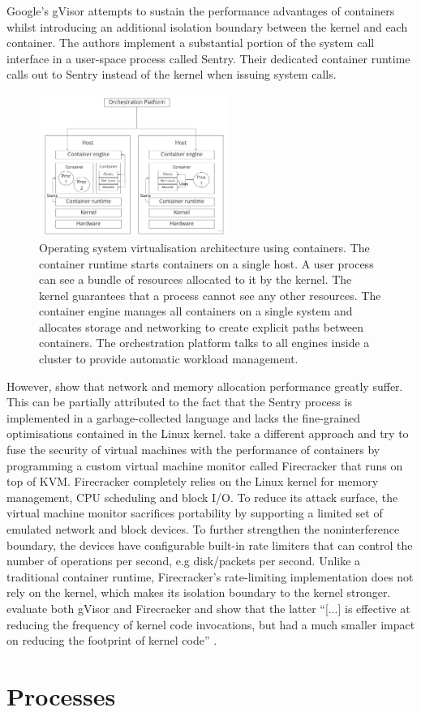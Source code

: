 Google's gVisor \cite{google-gvisor} attempts to sustain the performance advantages of 
containers whilst introducing an additional isolation boundary between the kernel and each container. The authors implement 
a substantial portion of the system call interface in a user-space process called Sentry.
Their dedicated container runtime calls out to Sentry instead of the kernel when issuing system calls.
\begin{figure}[H]
    \centering
    \includegraphics[width=0.55\textwidth]{images/fundamentals/cont-arch.jpg}
    \caption{Operating system virtualisation architecture using containers. The container runtime starts containers on a single host.
    A user process can see a bundle of resources allocated to it by the kernel. The kernel guarantees that a process 
    cannot see any other resources.
    The container engine manages all containers on a single system and allocates storage and networking to create explicit paths between containers.
    The orchestration platform talks to all engines inside a cluster to provide automatic workload management.}
    \label{images:fundamentals/cont-arch.jpg}
\end{figure}
However, \textcite{234857} show that network and memory allocation performance greatly suffer. 
This can be partially attributed to the fact that the Sentry process is implemented in a garbage-collected language 
and lacks the fine-grained optimisations contained in the Linux kernel.
\textcite{246288} take a different approach and try to fuse the security of virtual machines 
with the performance of containers by programming a custom virtual machine monitor 
called Firecracker that runs on top of KVM. Firecracker completely relies on the
Linux kernel for memory management, CPU scheduling and block I/O. To reduce its attack surface,
the virtual machine monitor sacrifices portability by supporting a limited set of emulated 
network and block devices. To further strengthen the noninterference boundary, the devices 
have configurable built-in rate limiters that can control the number of operations per second, e.g
disk/packets per second. Unlike a traditional container runtime, Firecracker's rate-limiting implementation
does not rely on the kernel, which makes its isolation boundary to the kernel stronger. 
\textcite{10.1145/3381052.3381315} evaluate both gVisor and Firecracker and show that 
the latter \enquote{[...] is effective at reducing the frequency of kernel code invocations, but had 
a much smaller impact on reducing the footprint of kernel code} \cite[12]{10.1145/3381052.3381315}. 
\clearpage

\section{Processes}
